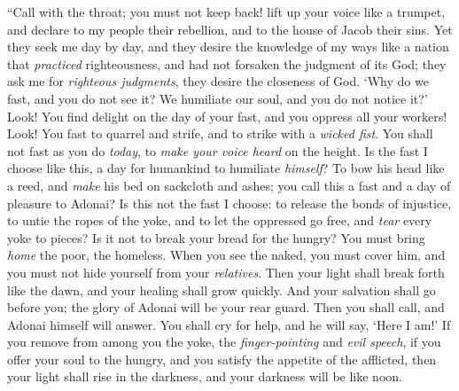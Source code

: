 \begin{biblechapter} %
 “Call with the throat; you must not keep back! 
lift up your voice like a trumpet, 
and declare to my people their rebellion, 
and to the house of Jacob their sins.
\verse Yet they seek me day by day, 
and they desire the knowledge of my ways 
like a nation that \textit{practiced} righteousness, 
and had not forsaken the judgment of its God; 
they ask me for \textit{righteous judgments}, 
they desire the closeness of God.
\verse ‘Why do we fast, and you do not see it? 
We humiliate our soul, and you do not notice it?’ 
Look! You find delight on the day of your fast, 
and you oppress all your workers!
\verse Look! You fast to quarrel and strife, 
and to strike with a \textit{wicked fist}. 
You shall not fast as you do \textit{today}, 
to \textit{make your voice heard} on the height.
\verse Is the fast I choose like this, 
a day for humankind to humiliate \textit{himself}? 
To bow his head like a reed, 
and \textit{make} his bed on sackcloth and ashes; 
you call this a fast 
and a day of pleasure to Adonai?
\verse Is this not the fast I choose: to release the bonds of injustice, 
to untie the ropes of the yoke, 
and to let the oppressed go free, 
and \textit{tear} every yoke to pieces?
\verse Is it not to break your bread for the hungry? 
You must bring \textit{home} the poor, the homeless. 
When you see the naked, you must cover him, 
and you must not hide yourself from your \textit{relatives}.
\verse Then your light shall break forth like the dawn, 
and your healing shall grow quickly. 
And your salvation shall go before you; 
the glory of Adonai will be your rear guard.
\verse Then you shall call, and Adonai himself will answer. 
You shall cry for help, and he will say, ‘Here I am!’ 
If you remove from among you the yoke, 
the \textit{finger-pointing} and \textit{evil speech},
\verse if you offer your soul to the hungry, 
and you satisfy the appetite of the afflicted, 
then your light shall rise in the darkness, 
and your darkness will be like noon.

\end{biblechapter}
